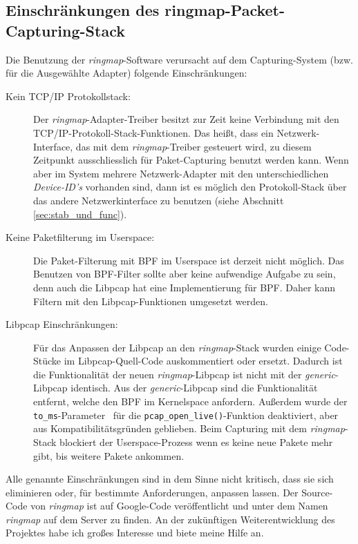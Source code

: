 \subsection{Einschränkungen des ringmap-Packet-Capturing-Stack}\label{sec:einschr}
Die Benutzung der \emph{ringmap}-Software verursacht auf dem Capturing-System
(bzw. für die Ausgewählte Adapter) folgende Einschränkungen:
\begin{description}
	\item [Kein TCP/IP Protokollstack:] Der \emph{ringmap}-Adapter-Treiber
		besitzt zur Zeit keine Verbindung mit den TCP/IP-Protokoll-Stack-Funktionen.
		Das heißt, dass ein Netzwerk-Interface, das  mit dem
		\emph{ringmap}-Treiber gesteuert wird, zu diesem Zeitpunkt ausschliesslich für
		Paket-Capturing benutzt werden kann. Wenn aber im System mehrere
		Netzwerk-Adapter mit den unterschiedlichen \emph{Device-ID's} vorhanden
		sind, dann ist es möglich den Protokoll-Stack über das andere
		Netzwerkinterface zu benutzen (siehe Abschnitt
		\ref{sec:stab_und_func}).
	\item [Keine Paketfilterung im Userspace:] Die Paket-Filterung mit  BPF
		im Userspace ist derzeit nicht möglich. Das Benutzen von
		BPF-Filter sollte aber keine aufwendige Aufgabe zu sein, denn auch die  Libpcap hat eine 
		Implementierung für BPF. Daher kann Filtern mit den
		Libpcap-Funktionen umgesetzt werden.
	\item [Libpcap Einschränkungen:] Für das Anpassen der Libpcap an den \emph{ringmap}-Stack wurden einige Code-Stücke im
		Libpcap-Quell-Code auskommentiert oder ersetzt. Dadurch ist die
		Funktionalität der neuen \emph{ringmap}-Libpcap ist nicht mit
		der \emph{generic}-Libpcap identisch. Aus der
		\emph{generic}-Libpcap sind die Funktionalität entfernt, welche den
		BPF im Kernelspace anfordern. Außerdem wurde der
		\verb+to_ms+-Parameter~\cite{man_pcap} für die
		\verb+pcap_open_live()+-Funktion deaktiviert, aber aus 
		Kompatibilitätsgründen geblieben. Beim
		Capturing mit dem \emph{ringmap}-Stack blockiert der Userspace-Prozess wenn
		es keine neue Pakete mehr gibt, bis  weitere Pakete ankommen.
\end{description}
Alle genannte Einschränkungen sind  in dem Sinne nicht kritisch, dass 
sie sich eliminieren oder, für bestimmte Anforderungen, anpassen lassen. 
Der Source-Code von \emph{ringmap} ist auf Google-Code veröffentlicht 
und unter dem Namen \emph{ringmap} auf dem Server zu finden. An der  zukünftigen 
Weiterentwicklung des Projektes habe ich großes Interesse und biete meine Hilfe an.

